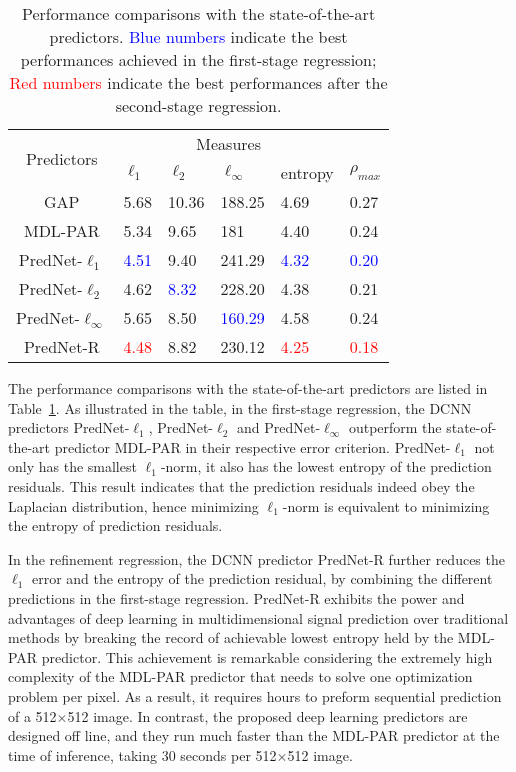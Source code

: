 \documentclass{article}
\begin{document}
\begin{table}[!ht]
\centering
\caption{Performance comparisons with the state-of-the-art predictors. \textcolor{blue}{Blue numbers} indicate the best performances achieved in the first-stage regression; \textcolor{red}{Red numbers} indicate the best performances after the second-stage regression.}
\centering
\label{tab:self-ent}
\renewcommand\arraystretch{1.3}
\vskip 0.2cm
\begin{tabular}{c|p{0.8cm}<{\centering}p{0.8cm}<{\centering}p{0.8cm}<{\centering}p{0.8cm}<{\centering}p{0.8cm}<{\centering}}
\hline
\multirow{2}{*}{Predictors} & \multicolumn{4}{c}{Measures} \\
	& $\ell_1$ & $\ell_2$ & $\ell_\infty$ & entropy & $\rho_{max}$ \\
\hline
GAP  & 5.68 & 10.36 & 188.25 & 4.69 & 0.27 \\
MDL-PAR  & 5.34 & 9.65 & 181 & 4.40 & 0.24\\
\hline
PredNet-$\ell_1$ & \textcolor{blue}{4.51} & 9.40 & 241.29 & \textcolor{blue}{4.32} & \textcolor{blue}{0.20} \\
PredNet-$\ell_2$ & 4.62 & \textcolor{blue}{8.32} & 228.20 & 4.38 & 0.21 \\
PredNet-$\ell_\infty$ & 5.65 & {8.50} & \textcolor{blue}{160.29} & 4.58 & 0.24 \\
\hline
PredNet-R & \textcolor{red}{4.48} & 8.82 & 230.12 & \textcolor{red}{4.25} & \textcolor{red}{0.18}\\
\hline
\end{tabular}
\end{table}

The performance comparisons with the state-of-the-art predictors are listed in Table~\ref{tab:self-ent}.
As illustrated in the table, in the first-stage regression,  the DCNN predictors PredNet-$\ell_1$, PredNet-$\ell_2$ and PredNet-$\ell_\infty$ outperform the state-of-the-art predictor MDL-PAR in their respective error criterion.
PredNet-$\ell_1$ not only has the smallest $\ell_1$-norm, it also has the lowest entropy of the prediction residuals.  This result indicates that the prediction residuals indeed obey the Laplacian distribution, hence minimizing $\ell_1$-norm is equivalent to minimizing the entropy of prediction residuals.

In the refinement regression, the DCNN predictor PredNet-R further reduces the $\ell_1$ error and the entropy of the prediction residual, by combining the different predictions in the first-stage regression.  PredNet-R exhibits the power and advantages of deep learning in multidimensional signal prediction over traditional methods by breaking the record of achievable lowest entropy held by the MDL-PAR predictor.  This achievement is remarkable considering the extremely high complexity of the MDL-PAR predictor that needs to solve one optimization problem per pixel.  As a result, it requires hours to preform sequential prediction of a 512$\times$512 image.  In contrast, the proposed deep learning predictors are designed off line, and they run much faster than the MDL-PAR predictor at the time of inference, taking 30 seconds per 512$\times$512 image.
\end{document}
